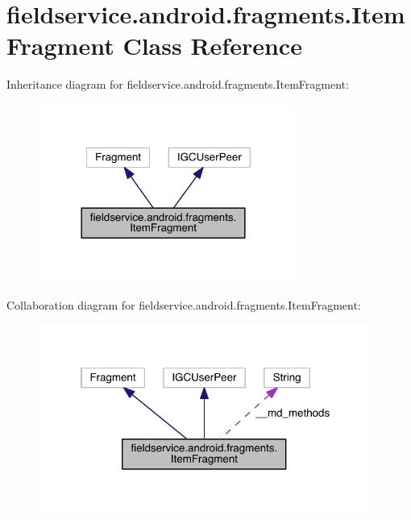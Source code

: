 \hypertarget{classfieldservice_1_1android_1_1fragments_1_1_item_fragment}{\section{fieldservice.\+android.\+fragments.\+Item\+Fragment Class Reference}
\label{classfieldservice_1_1android_1_1fragments_1_1_item_fragment}
}


Inheritance diagram for fieldservice.\+android.\+fragments.\+Item\+Fragment\+:
\nopagebreak
\begin{figure}[H]
\begin{center}
\leavevmode
\includegraphics[width=237pt]{classfieldservice_1_1android_1_1fragments_1_1_item_fragment__inherit__graph}
\end{center}
\end{figure}


Collaboration diagram for fieldservice.\+android.\+fragments.\+Item\+Fragment\+:
\nopagebreak
\begin{figure}[H]
\begin{center}
\leavevmode
\includegraphics[width=311pt]{classfieldservice_1_1android_1_1fragments_1_1_item_fragment__coll__graph}
\end{center}
\end{figure}
